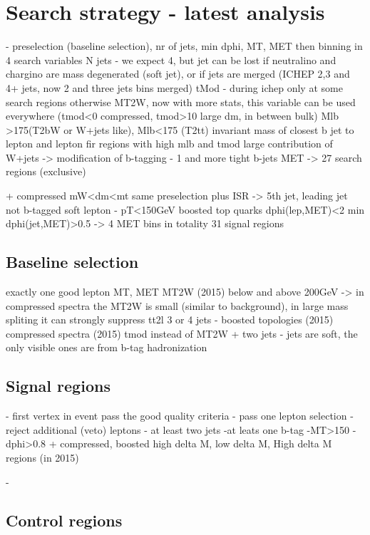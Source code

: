 \section{Search strategy - latest analysis}
- preselection (baseline selection), nr of jets, min dphi, MT, MET
then binning in 4 search variables
	N jets - we expect 4, but jet can be lost if neutralino and chargino are mass degenerated (soft jet), or if jets are merged
        	(ICHEP 2,3 and 4+ jets, now 2 and three jets bins merged)
	tMod - during ichep only at some search regions otherwise MT2W, now with more stats, this variable can be used everywhere (tmod<0 compressed, tmod>10 large dm, in between bulk)
	Mlb >175(T2bW or W+jets like), Mlb<175 (T2tt) invariant mass of closest b jet to lepton and lepton
		fir regions with high mlb and tmod large contribution of W+jets -> modification of b-tagging - 1 and more tight b-jets
	MET
	-> 27 search regions (exclusive)

+ compressed mW<dm<mt
	same preselection plus
	ISR -> 5th jet, leading jet not b-tagged
	soft lepton - pT<150GeV
	boosted top quarks dphi(lep,MET)<2
	min dphi(jet,MET)>0.5
        -> 4 MET bins
in totality 31 signal regions

\subsection{Baseline selection}
	exactly one good lepton
	MT, MET
	MT2W (2015) below and above 200GeV -> in compressed spectra the MT2W is small (similar to background), in large mass spliting it can strongly suppress tt2l
	3 or 4 jets - boosted topologies (2015)
        compressed spectra (2015) tmod instead of MT2W + two jets - jets are soft, the only visible ones are from b-tag hadronization

\subsection{Signal regions}
	- first vertex in event pass the good quality criteria
	- pass one lepton selection
	- reject additional (veto) leptons
	- at least two jets
	-at leats one b-tag
	-MT>150
	-dphi>0.8
	+ compressed, boosted high delta M, low delta M, High delta M regions (in 2015)

-\subsection{Control regions}



